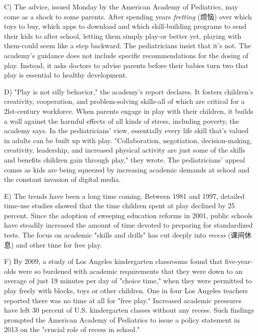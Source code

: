 \documentclass[UTF8,11pt]{ctexart}
\begin{document}
C) The advice, issued Monday by the American Academy of Pediatrics, may come as a shock to some parents. After spending years \textit{fretting }(烦恼) over which toys to buy, which apps to download and which skill-building programs to send their kids to after school, letting them simply play-or better yet, playing with them-could seem like a step backward. The pediatricians insist that it's not. The academy's guidance does not include specific recommendations for the dosing of play. Instead, it asks doctors to advise parents before their babies turn two that play is essential to healthy development.


D) "Play is not silly behavior," the academy's report declares. It fosters children's creativity, cooperation, and problem-solving skills-all of which are critical for a 2lst-century workforce. When parents engage in play with their children, it builds a wall against the harmful effects of all kinds of stress, including poverty, the academy says. In the pediatricians' view, essentially every life skill that's valued in adults can be built up with play. "Collaboration, negotiation, decision-making, creativity, leadership, and increased physical activity are just some of the skills and benefits children gain through play," they wrote. The pediatricians' appeal comes as kids are being squeezed by increasing academic demands at school and the constant invasion of digital media.


E) The trends have been a long time coming. Between 1981 and 1997, detailed time-use studies showed that the time children spent at play declined by 25 percent. Since the adoption of sweeping education reforms in 2001, public schools have steadily increased the amount of time devoted to preparing for standardized tests. The focus on academic "skills and drills" has cut deeply into \textit{recess }(课间休息) and other time for free play.


F) By 2009, a study of Los Angeles kindergarten classrooms found that five-year-olds were so burdened with academic requirements that they were down to an average of just 19 minutes per day of "choice time," when they were permitted to play freely with blocks, toys or other children. One in four Los Angeles teachers reported there was no time at all for "free play." Increased academic pressures have left 30 percent of U.S. kindergarten classes without any recess. Such findings prompted the American Academy of Pediatrics to issue a policy statement in 2013 on the "crucial role of recess in school."
\end{document}
